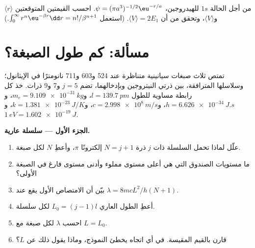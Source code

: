 \begin{exercise}[$\star\star\star$]\label{exo:b3:quantum-model-systems:12}
من أجل الحالة $1s$ للهيدروجين، $\psi = (\pi a^3)^{-1/2}\eu^{-r/a}$. احسب
القيمتين المتوقعتين $\langle r\rangle$ و$\langle V\rangle$، وتحقق من أن
$\langle V\rangle = 2E_1$. (استعمل $\int_0^\infty r^n\eu^{-\beta r}\dd r =
n!/\beta^{n+1}$.)
\end{exercise}

\section{مسألة: كم طول الصبغة؟}

\begin{problem}
\label{pb:b3:quantum-model-systems:1}
تمتص ثلاث صبغات سيانينية متناظرة عند 524 و603 و711 نانومترًا في الإيثانول؛ 
وسلاسلها المترافقة، بين ذرتي النيتروجين وبإدخالهما، تضم $j = 5$ و7
و9 ذرات. خذ كل رابطة مساوية للطول $l = \qty{139.7}{pm}$، و$m_e =
\qty{9.109e-31}{kg}$، و$h = \qty{6.626e-34}{J.s}$، و$c = \qty{2.998e8}{m/s}$،
و$k = \qty{1.381e-23}{J/K}$، و$\qty{1}{eV} = \qty{1.602e-19}{J}$.

\medskip\noindent\textbf{الجزء الأول --- سلسلة عارية.}
\begin{enumerate}
  \item علّل لماذا تحمل السلسلة ذات $j$ ذرة $N = j + 1$ إلكترونًا $\pi$، 
        وأعطِ $N$ لكل صبغة.
  \item ما مستويات الصندوق التي هي أعلى مستوى مملوء وأدنى مستوى فارغ
        في الصبغة الأولى؟
  \item بيّن أن الامتصاص الأول يقع عند $\lambda = 8mcL^2/h(N+1)$.
  \item أعطِ الطول العاري $L_0 = (j - 1)l$ لكل سلسلة.
  \item احسب $\lambda$ لكل صبغة مع $L = L_0$.
  \item قارن بالقيم المقيسة. في أي اتجاه يخطئ النموذج،
        وماذا يقول ذلك عن $L$؟
\end{enumerate}


\end{problem}
